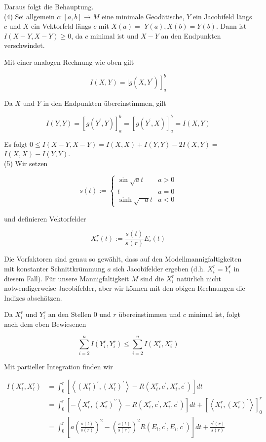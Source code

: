 \documentclass[10pt, letterpaper]{article}
\begin{document}
Daraus folgt die Behauptung.\\
(4) Sei allgemein $c:[a, b] \rightarrow M$ eine minimale Geodätische, $Y$ ein Jacobifeld längs $c$ und $X$ ein Vektorfeld längs $c$ mit $X(a)=$ $Y(a), X(b)=Y(b)$. Dann ist $I(X-Y, X-Y) \geq 0$, da $c$ minimal ist und $X-Y$ an den Endpunkten verschwindet.

Mit einer analogen Rechnung wie oben gilt

$$
\left.I(X, Y)=\mid g\left(X, Y^{\prime}\right)\right]_{a}^{b}
$$

Da $X$ und $Y$ in den Endpunkten übereinstimmen, gilt

$$
I(Y, Y)=\left[g\left(Y^{\prime}, Y\right)\right]_{a}^{b}=\left[g\left(Y^{\prime}, X\right)\right]_{a}^{b}=I(X, Y)
$$

Es folgt $0 \leq I(X-Y, X-Y)=I(X, X)+I(Y, Y)-2 I(X, Y)=$ $I(X, X)-I(Y, Y)$.\\
(5) Wir setzen

$$
s(t):= \begin{cases}\sin \sqrt{a} t & a>0 \\ t & a=0 \\ \sinh \sqrt{-a} t & a<0\end{cases}
$$

und definieren Vektorfelder

$$
X_{i}^{r}(t):=\frac{s(t)}{s(r)} E_{i}(t)
$$

Die Vorfaktoren sind genau so gewählt, dass auf den Modellmannigfaltigkeiten mit konstanter Schnittkrümmung $a$ sich Jacobifelder ergeben (d.h. $X_{i}^{r}=Y_{i}^{r}$ in diesem Fall). Für unsere Mannigfaltigkeit $M$ sind die $X_{i}^{r}$ natürlich nicht notwendigerweise Jacobifelder, aber wir können mit den obigen Rechnungen die Indizes abschätzen.

Da $X_{i}^{r}$ und $Y_{i}^{r}$ an den Stellen 0 und $r$ übereinstimmen und $c$ minimal ist, folgt nach dem eben Bewiesenen

$$
\sum_{i=2}^{n} I\left(Y_{i}^{r}, Y_{i}^{r}\right) \leq \sum_{i=2}^{n} I\left(X_{i}^{r}, X_{i}^{r}\right)
$$

Mit partieller Integration finden wir

$$
\begin{aligned}
I\left(X_{i}^{r}, X_{i}^{r}\right) & =\int_{0}^{r}\left[\left\langle\left(X_{i}^{r}\right)^{\prime},\left(X_{i}^{r}\right)^{\prime}\right\rangle-R\left(X_{i}^{r}, c^{\prime}, X_{i}^{r}, c^{\prime}\right)\right] d t \\
& =\int_{0}^{r}\left[-\left\langle X_{i}^{r},\left(X_{i}^{r}\right)^{\prime \prime}\right\rangle-R\left(X_{i}^{r}, c^{\prime}, X_{i}^{r}, c^{\prime}\right)\right] d t+\left[\left\langle X_{i}^{r},\left(X_{i}^{r}\right)^{\prime}\right\rangle\right]_{0}^{r} \\
& =\int_{0}^{r}\left[a\left(\frac{s(t)}{s(r)}\right)^{2}-\left(\frac{s(t)}{s(r)}\right)^{2} R\left(E_{i}, c^{\prime}, E_{i}, c^{\prime}\right)\right] d t+\frac{s^{\prime}(r)}{s(r)}
\end{aligned}
$$
\end{document}
